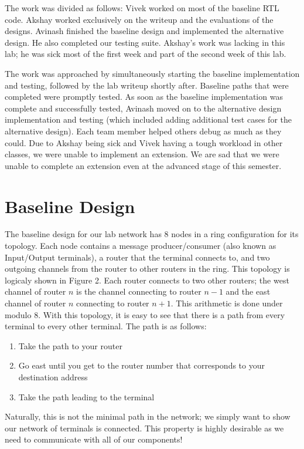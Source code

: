 \documentclass[10pt]{article}
\begin{document}
The work was divided as follows:
Vivek worked on most of the baseline RTL code.
Akshay worked exclusively on the writeup and the evaluations of the designs.
Avinash finished the baseline design and implemented the alternative design.
He also completed our testing suite.
Akshay's work was lacking in this lab; he was sick most of the first week
and part of the second week of this lab. \par

The work was approached by simultaneously starting the baseline 
implementation and testing, followed by the lab writeup shortly after.
Baseline paths that were completed were promptly tested. 
As soon as the baseline implementation was complete and successfully tested, 
Avinash moved on to the alternative design implementation and testing 
(which included adding additional test cases for the alternative design). 
Each team member helped others debug as much as they could. 
Due to Akshay being sick and Vivek having a tough workload in other classes,
we were unable to implement an extension. 
We are sad that we were unable to complete an extension even at the advanced
stage of this semester. 


\section{Baseline Design}

The baseline design for our lab network has 8 nodes in a ring configuration
for its topology. 
Each node contains a message producer/consumer (also known as Input/Output 
terminals), a router that the terminal connects to,
and two outgoing channels from the router to other routers in the ring.
This topology is logicaly shown in Figure 2. 
Each router connects to two other routers; the west channel of router $n$ 
is the channel connecting to router $n-1$ and 
the east channel of router $n$ connecting to router $n+1$.
This arithmetic is done under modulo 8.
With this topology, it is easy to see that there is a path from every terminal
to every other terminal.
The path is as follows:
\begin{enumerate}[nolistsep]
	\item Take the path to your router
	\item Go east until you get to the router number that corresponds to your 
		  destination address
	\item Take the path leading to the terminal
\end{enumerate}
Naturally, this is not the minimal path in the network; we simply want to show
our network of terminals is connected.
This property is highly desirable as we need to communicate with 
all of our components! \par
\end{document}

